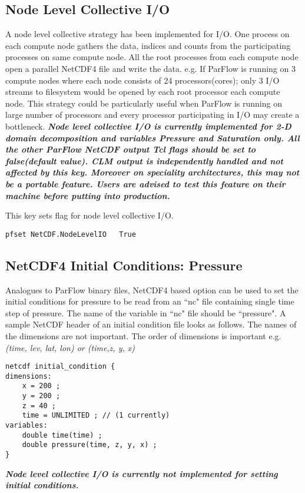\subsection{Node Level Collective I/O}
A node level collective strategy has been implemented for I/O. One process on each compute node gathers the data, indices and counts from the participating processes on same compute node. All the root processes from each compute node open a parallel NetCDF4 file and write the data. e.g. If ParFlow is running on 3 compute nodes where each node consists of 24 processors(cores); only 3 I/O streams to filesystem would be opened by each root processor each compute node. This strategy could be particularly useful when ParFlow is running on large number of processors and every processor participating in I/O may create a bottleneck.
\textit{\textbf{Node level collective I/O is currently implemented for 2-D domain decomposition and variables Pressure and Saturation only. All the other ParFlow NetCDF output Tcl flags should be set to false(default value). CLM output is independently handled and not affected by this key.  Moreover on speciality architectures, this may not be a portable feature. Users are advised to test this feature on their machine before putting into production.}}

{This key sets flag for node level collective I/O.}
\begin{display}\begin{verbatim}
pfset NetCDF.NodeLevelIO   True
\end{verbatim}\end{display}

\subsection{NetCDF4 Initial Conditions: Pressure}
Analogues to ParFlow binary files, NetCDF4 based option can be used to set the initial conditions for pressure to be read from an ``nc" file containing single time step of pressure. The name of the variable in ``nc" file should be ``pressure". A sample NetCDF header of an initial condition file looks as follows. The names of the dimensions are not important. The order of dimensions is important e.g. \textit{(time, lev, lat, lon) or (time,z, y, x)}
\begin{display}\begin{verbatim}
netcdf initial_condition {
dimensions:
	x = 200 ;
	y = 200 ;
	z = 40 ;
	time = UNLIMITED ; // (1 currently)
variables:
	double time(time) ;
	double pressure(time, z, y, x) ;
}
\end{verbatim}\end{display}
\textit{\textbf{Node level collective I/O is currently not implemented for setting initial conditions.}}

